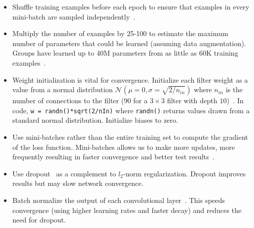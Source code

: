 \begin{itemize}

	\item Shuffle training examples before each epoch to ensure that examples in every mini-batch are sampled independently~\cite{Bengio2012}.

	\item Multiply the number of examples by 25-100 to estimate the maximum number of parameters that could be learned (assuming data augmentation). Groups have learned up to 40M parameters from as little as 60K training examples~\cite{Dieleman2015, Springenberg2014}.

	\item Weight initialization is vital for convergence. Initialize each filter weight as a value from a normal distribution $\mathcal{N}(\mu = 0, \sigma = \sqrt{2/n_{in}})$ where $n_{in}$ is the number of connections to the filter (90 for a $3\times 3$ filter with depth $10$)~\cite{He2015a}. In code, \texttt{w = randn()*sqrt(2/nIn)} where \texttt{randn()} returns values drawn from a standard normal distribution. Initialize biases to zero.

	\item Use mini-batches rather than the entire training set to compute the gradient of the loss function. Mini-batches allows us to make more updates, more frequently resulting in faster convergence and better test results~\cite{Bengio2012}.

	\item Use dropout~\cite{Krizhevsky2012} as a complement to $l_2$-norm regularization. Dropout improves results but may slow network convergence.

	\item Batch normalize the output of each convolutional layer~\cite{Ioffe2015}. This speeds convergence (using higher learning rates and faster decay) and reduces the need for dropout. %


\end{itemize}
